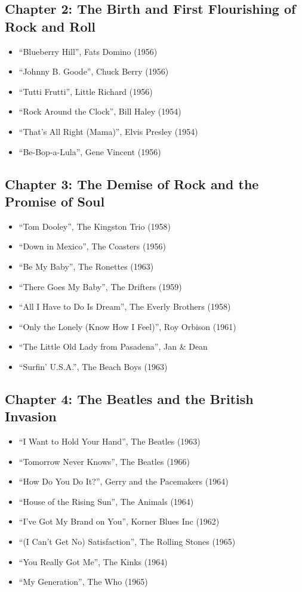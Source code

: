 \documentclass[12pt, a4paper]{book}
\begin{document}
\subsection*{Chapter 2: The Birth and First Flourishing of Rock and Roll}
\begin{itemize}
    \item ``Blueberry Hill'', Fats Domino (1956)
    \item ``Johnny B. Goode'', Chuck Berry (1956)
    \item ``Tutti Frutti'', Little Richard (1956)
    \item ``Rock Around the Clock'', Bill Haley (1954)
    \item ``That's All Right (Mama)'', Elvis Presley (1954)
    \item ``Be-Bop-a-Lula'', Gene Vincent (1956)
\end{itemize}

\subsection*{Chapter 3: The Demise of Rock and the Promise of Soul}
\begin{itemize}
    \item ``Tom Dooley'', The Kingston Trio (1958)
    \item ``Down in Mexico'', The Coasters (1956)
    \item ``Be My Baby'', The Ronettes (1963)
    \item ``There Goes My Baby'', The Drifters (1959)
    \item ``All I Have to Do Is Dream'', The Everly Brothers (1958)
    \item ``Only the Lonely (Know How I Feel)'', Roy Orbison (1961)
    \item ``The Little Old Lady from Pasadena'', Jan \& Dean
    \item ``Surfin' U.S.A.'', The Beach Boys (1963)
\end{itemize}

\subsection*{Chapter 4: The Beatles and the British Invasion}
\begin{itemize}
    \item ``I Want to Hold Your Hand'', The Beatles (1963)
    \item ``Tomorrow Never Knows'', The Beatles (1966)
    \item ``How Do You Do It?'', Gerry and the Pacemakers (1964)
    \item ``House of the Rising Sun'', The Animals (1964)
    \item ``I've Got My Brand on You'', Korner Blues Inc (1962)
    \item ``(I Can't Get No) Satisfaction'', The Rolling Stones (1965)
    \item ``You Really Got Me'', The Kinks (1964)
    \item ``My Generation'', The Who (1965)
\end{itemize}
\end{document}
